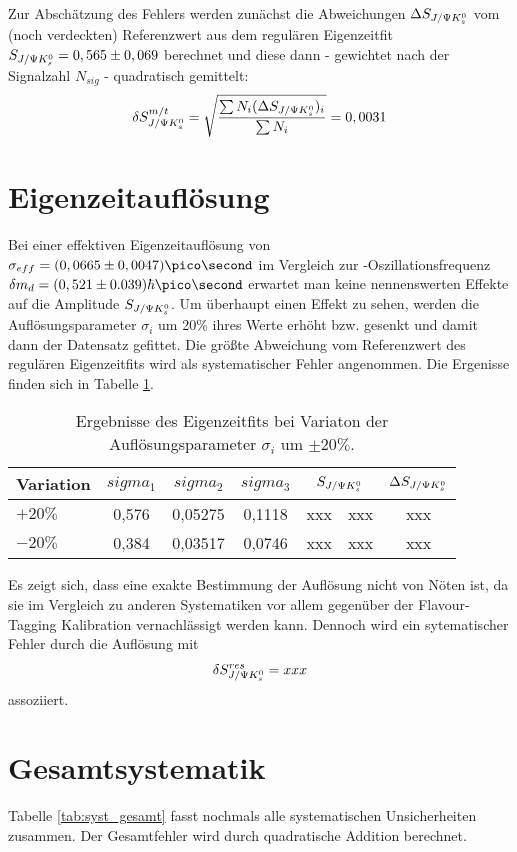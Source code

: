 Zur Abschätzung des Fehlers werden zunächst die Abweichungen $\Delta S_{J/\Psi K_s^0}$ vom (noch verdeckten) Referenzwert aus dem regulären Eigenzeitfit $S_{J/\Psi K_s^0} = 0,565 \pm 0,069$ berechnet und diese dann - gewichtet nach der Signalzahl $N_{sig}$ - quadratisch gemittelt:
\begin{align}
\delta S_{J/\Psi K_s^0}^{m/t} = \sqrt{\frac{\sum N_i (\Delta S_{J/\Psi K_s^0})_i}{\sum N_i}} = 0,0031
\end{align}

\section{Eigenzeitauflösung}
Bei einer effektiven Eigenzeitauflösung von $\sigma_{eff} = (0,0665 \pm 0,0047)\ps$ im Vergleich zur \Bd-Oszillationsfrequenz $\delta m_d = (0,521 \pm 0.039)\hbar\ps$ erwartet man keine nennenswerten Effekte auf die Amplitude $S_{J/\Psi K_s^0}$. Um überhaupt einen Effekt zu sehen, werden die Auflösungsparameter $\sigma_i$ um 20\% ihres Werte erhöht bzw. gesenkt und damit dann der Datensatz gefittet. Die größte Abweichung vom Referenzwert des regulären Eigenzeitfits wird als systematischer Fehler angenommen. Die Ergenisse finden sich in Tabelle \ref{tab:syst_resolution}.

\begin{table}[hptb]
\centering
\caption{Ergebnisse des Eigenzeitfits bei Variaton der Auflösungsparameter $\sigma_i$ um $\pm 20\%$.}
\label{tab:syst_resolution}
\begin{tabular}{l c c c r@{$\pm$}l c }
\hline \hline
Variation & $sigma_1$ & $sigma_2$ & $sigma_3$ & \multicolumn{2}{c}{$S_{J/\Psi K_s^0}$} & $\Delta S_{J/\Psi K_s^0}$ \\ \hline
$+20\%$ & 0,576 & 0,05275 & 0,1118 & xxx & xxx & xxx \\
$-20\%$ & 0,384 & 0,03517 & 0,0746 & xxx & xxx & xxx \\ \hline \hline
\end{tabular}
\end{table}

Es zeigt sich, dass eine exakte Bestimmung der Auflösung nicht von Nöten ist, da sie im Vergleich zu anderen Systematiken vor allem gegenüber der Flavour-Tagging Kalibration vernachlässigt werden kann. Dennoch wird ein sytematischer Fehler durch die Auflösung mit
\begin{align}
\delta S_{J/\Psi K_s^0}^{res} = xxx
\end{align}
assoziiert.

\section{Gesamtsystematik}
Tabelle \ref{tab:syst_gesamt} fasst nochmals alle systematischen Unsicherheiten zusammen. Der Gesamtfehler wird durch quadratische Addition berechnet.

